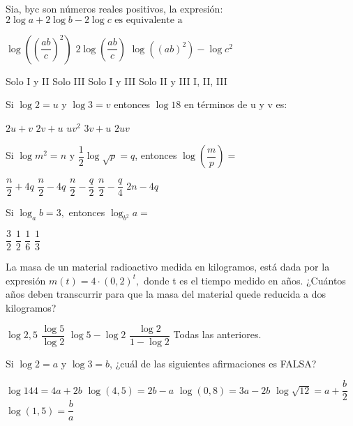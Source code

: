 \documentclass[pagina vacia]{srs}
\begin{document}
\begin{preguntas}
\pregunta Sia, byc son números reales positivos, la expresión: $2 \log a+2 \log b-2 \log c \text{ es equivalente a}$
\begin{verticali}
\alternativa $\log\left(\left(\dfrac{ab}{c}\right)^{2}\right)$
\alternativa $2 \log\left(\dfrac{ab}{c}\right)$
\alternativa $\log\left(\left(ab\right)^{2}\right)-\log c^{2}$
\end{verticali}
\begin{vertical}
\alternativa Solo I y II
\alternativa Solo III
\alternativa Solo I y III
\alternativa Solo II y III
\alternativa I, II, III
\end{vertical}

\pregunta Si $\log 2=u \text{ y } \log 3=v$ entonces $\log 18$ en términos de u y v es:
\begin{vertical}
\alternativa $2u+v$
\alternativa $2v+u$
\alternativa $uv^{2}$
\alternativa $3v+u$
\alternativa $2uv$
\end{vertical}

\pregunta Si $\log m^{2}=n \text{ y } \dfrac{1}{2}\log\sqrt{p}=q$, entonces $\log\left(\dfrac{m}{p}\right)=$
\begin{vertical}
\alternativa $\dfrac{n}{2}+4q$
\alternativa $\dfrac{n}{2}-4q$
\alternativa $\dfrac{n}{2}-\dfrac{q}{2}$
\alternativa $\dfrac{n}{2}-\dfrac{q}{4}$
\alternativa $2n-4q$
\end{vertical}

\pregunta Si $\log_{a}b=3,$ entonces $\log_{b^{2}}a=$
\begin{vertical}
\alternativa $\dfrac{3}{2}$
\alternativa $\dfrac{1}{2}$
\alternativa $\dfrac{1}{6}$
\alternativa $\dfrac{1}{3}$
\end{vertical}

\pregunta La masa de un material radioactivo medida en kilogramos, está dada por la expresión $m\left(t\right)=4\cdot\left(0,2\right)^{t},$ donde t es el tiempo medido en años. ¿Cuántos años deben transcurrir para que la masa del material quede reducida a dos kilogramos?
\begin{vertical}
\alternativa $\log 2,5$
\alternativa $\dfrac{\log 5}{\log 2}$
\alternativa $\log 5-\log 2$
\alternativa $\dfrac{\log 2}{1-\log 2}$
\alternativa Todas las anteriores.
\end{vertical}

\pregunta Si $\log 2=a \text{ y } \log 3=b$, ¿cuál de las siguientes afirmaciones es FALSA?
\begin{vertical}
\alternativa $\log 144=4a+2b$
\alternativa $\log\left(4,5\right)=2b-a$
\alternativa $\log\left(0,8\right)=3a-2b$
\alternativa $\log\sqrt{12}=a+\dfrac{b}{2}$
\alternativa $\log\left(1,5\right)=\dfrac{b}{a}$
\end{vertical}


\end{preguntas}
\end{document}
